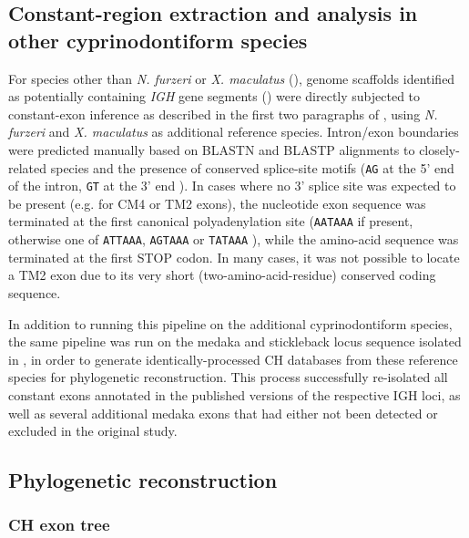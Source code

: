 \subsection{Constant-region extraction and analysis in other cyprinodontiform species}
\label{sec:ch_char_crossspecies}

For species other than \textit{N. furzeri} or \textit{X. maculatus} (), genome scaffolds identified as potentially containing \textit{IGH} gene segments () were directly subjected to constant-exon inference as described in the first two paragraphs of , using \textit{N. furzeri} and \textit{X. maculatus} as additional reference species. Intron/exon boundaries were predicted manually based on BLASTN and BLASTP alignments to closely-related species and the presence of conserved splice-site motifs (\texttt{AG} at the 5' end of the intron, \texttt{GT} at the 3' end \citep{shapiro1987splice}). In cases where no 3' splice site was expected to be present (e.g. for CM4 or TM2 exons), the nucleotide exon sequence was terminated at the first canonical polyadenylation site (\texttt{AATAAA} if present, otherwise one of \texttt{ATTAAA}, \texttt{AGTAAA} or \texttt{TATAAA} \citep{ulitsky2012polya}), while the amino-acid sequence was terminated at the first STOP codon. In many cases, it was not possible to locate a TM2 exon due to its very short (two-amino-acid-residue) conserved coding sequence. %

In addition to running this pipeline on the additional cyprinodontiform species, the same pipeline was run on the medaka and stickleback locus sequence isolated in , in order to generate identically-processed CH databases from these reference species for phylogenetic reconstruction. This process successfully re-isolated all constant exons annotated in the published versions of the respective IGH loci, as well as several additional medaka exons that had either not been detected or excluded in the original study.

\subsection{Phylogenetic reconstruction}
\label{sec:phylo_methods}

\subsubsection{CH exon tree}
\label{sec:phylo_methods_ch}


